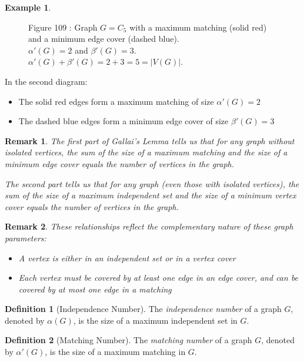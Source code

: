 \documentclass{article}
\newtheorem{remark}{Remark}
\theoremstyle{definition}
\newtheorem{example}{Example}
\newtheorem{definition}{Definition}
\begin{document}
\begin{example}
\begin{figure}[h]
\small {Figure 109 : Graph $G = C_5$ with a maximum matching (solid red) and a minimum edge cover (dashed blue). \\
$\alpha'(G) = 2$ and $\beta'(G) = 3$.\\
$\alpha'(G) + \beta'(G) = 2 + 3 = 5 = |V(G)|$.}
\end{figure}

In the second diagram:
\begin{itemize}
\item The solid red edges form a maximum matching of size $\alpha'(G) = 2$
\item The dashed blue edges form a minimum edge cover of size $\beta'(G) = 3$
\end{itemize}
\end{example}

\begin{remark}
The first part of Gallai's Lemma tells us that for any graph without isolated vertices, the sum of the size of a maximum matching and the size of a minimum edge cover equals the number of vertices in the graph.

The second part tells us that for any graph (even those with isolated vertices), the sum of the size of a maximum independent set and the size of a minimum vertex cover equals the number of vertices in the graph.
\end{remark}

\begin{remark}
These relationships reflect the complementary nature of these graph parameters:
\begin{itemize}
\item A vertex is either in an independent set or in a vertex cover
\item Each vertex must be covered by at least one edge in an edge cover, and can be covered by at most one edge in a matching
\end{itemize}
\end{remark}

\begin{definition}[Independence Number]
The \emph{independence number} of a graph $G$, denoted by $\alpha(G)$, is the size of a maximum independent set in $G$.
\end{definition}

\begin{definition}[Matching Number]
The \emph{matching number} of a graph $G$, denoted by $\alpha'(G)$, is the size of a maximum matching in $G$.
\end{definition}
\end{document}
